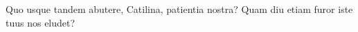 %

\chapter*{}
\thispagestyle{empty}


\vfill
\mbox{}
\vfill\Large
\begin{flushright}
  \begin{minipage}{8cm}
    \begin{center}

Quo usque tandem abutere, Catilina, patientia nostra? Quam diu etiam furor iste tuus nos eludet?

    \end{center}
  \end{minipage}
\end{flushright}
\normalsize\vfill

\cleardoublepage
